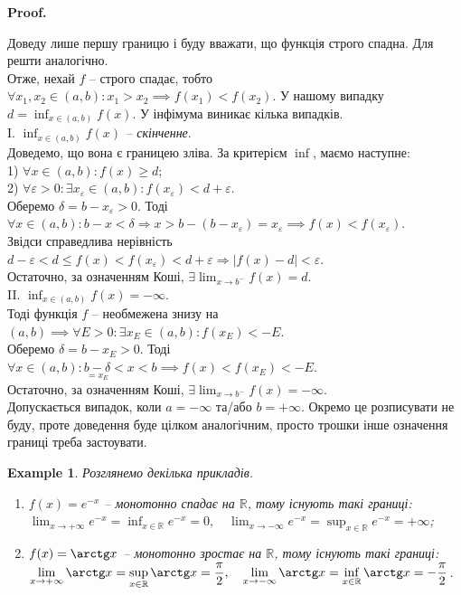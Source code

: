 \documentclass[a4paper, 14pt]{article}
\makeatletter
\def\qed{$\blacksquare$}
\theoremstyle{theoremdd}
\theoremstyle{theoremdd}
\theoremstyle{theoremdd}
\theoremstyle{theoremdd}
\newtheorem{example}[theorem]{Example}
\theoremstyle{theoremdd}
\theoremstyle{theoremdd}
\theoremstyle{theoremdd}
\theoremstyle{theoremdd}
\renewenvironment{proof}[1][Proof.\\]{\par
\pushQED{\hfill \qed}%
\normalfont \topsep6\p@\@plus6\p@\relax
\trivlist
\item\relax
{\bfseries
#1\@addpunct{.}}\hspace\labelsep\ignorespaces
}{%
\popQED\endtrivlist\@endpefalse
}
\makeatother
\begin{document}
\begin{proof}
Доведу лише першу границю і буду вважати, що функція строго спадна. Для решти аналогічно.
\bigskip \\
Отже, нехай $f$ -- строго спадає, тобто $\forall x_1,x_2 \in (a,b): x_1>x_2 \implies f(x_1)<f(x_2)$. У нашому випадку $d = \displaystyle \inf_{x \in (a,b)} f(x)$. У інфімума виникає кілька випадків.
\bigskip \\
I. \textit{$\displaystyle\inf_{x \in (a,b)} f(x)$ -- скінченне}.\\
Доведемо, що вона є границею зліва. За критерієм $\inf$, маємо наступне:\\
1) $\forall x \in (a,b): f(x) \geq d$;\\
2) $\forall \varepsilon > 0: \exists x_{\varepsilon} \in (a,b): f(x_{\varepsilon})< d + \varepsilon$.\\
Оберемо $\delta = b - x_{\varepsilon} > 0$. Тоді $\forall x \in (a,b): b-x<\delta \Rightarrow x > b - (b-x_{\varepsilon}) = x_{\varepsilon} \implies f(x) < f(x_\varepsilon)$.\\
Звідси справедлива нерівність $d - \varepsilon < d \leq f(x) < f(x_\varepsilon) < d + \varepsilon \Rightarrow |f(x)-d| < \varepsilon$.\\
Остаточно, за означенням Коші, $\exists \displaystyle \lim_{x \to b^-} f(x) =  d$.
\bigskip \\
II. $\displaystyle\inf_{x \in (a,b)} f(x) = -\infty$.\\
Тоді функція $f$ -- необмежена знизу на $(a,b) \implies \forall E>0: \exists x_E \in (a,b): f(x_E) < -E$.\\
Оберемо $\delta = b - x_E > 0$. Тоді $\forall x \in (a,b): \underset{=x_E}{b-\delta} < x < b \implies f(x) < f(x_E) < -E$.\\
Остаточно, за означенням Коші, $\exists \displaystyle \lim_{x \to b^-} f(x) = -\infty$.
\bigskip \\
Допускається випадок, коли $a = -\infty$ та/або $b = +\infty$. Окремо це розписувати не буду, проте доведення буде цілком аналогічним, просто трошки інше означення границі треба застоувати.
\end{proof}

\begin{example}
Розглянемо декілька прикладів.
\begin{enumerate}[nosep,wide=0pt,label={\arabic*)}]
\item $f(x) = e^{-x}$ -- монотонно спадає на $\mathbb{R}$, тому існують такі границі: \\
$\displaystyle\lim_{x \to +\infty} e^{-x} = \inf_{x \in \mathbb{R}} e^{-x} = 0, \quad \lim_{x \to -\infty} e^{-x} = \sup_{x \in \mathbb{R}} e^{-x} = +\infty$;
\item $f(x) = \arctg x$ -- монотонно зростає на $\mathbb{R}$, тому існують такі границі: \\
$\displaystyle\lim_{x \to +\infty} \arctg x = \sup_{x \in \mathbb{R}} \arctg x = \dfrac{\pi}{2}, \quad \displaystyle\lim_{x \to -\infty} \arctg x = \inf_{x \in \mathbb{R}} \arctg x = -\dfrac{\pi}{2}$.
\end{enumerate}
\end{example}
	
\end{document}
